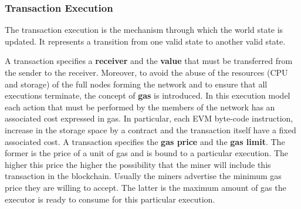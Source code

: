 \subsubsection{Transaction Execution}
\label{sec:tx-execution}

The transaction execution is the mechanism through which the world state is
updated. It represents a transition from one valid state to another valid state.

A transaction specifies a \textbf{receiver} and the \textbf{value} that must be
transferred from the sender to the receiver.
Moreover, to avoid the abuse of the resources
(CPU and storage) of the full nodes forming the network and to
ensure that all executions terminate, the concept of \textbf{gas} is introduced.
In this execution model each action that must be performed by the members
of the network has an associated cost expressed in gas.
In particular, each EVM byte-code instruction, increase in the storage
space by a contract and the transaction itself have a fixed associated cost.
A transaction specifies the \textbf{gas price} and the \textbf{gas limit}.
The former is the price of a unit of gas and is bound to a particular execution.
The higher this price the higher the
possibility that the miner will include this transaction in the blockchain.
Usually the miners advertise the minimum gas price they are willing to accept.
The latter is the maximum amount of gas the executor is ready to consume for
this particular execution.

